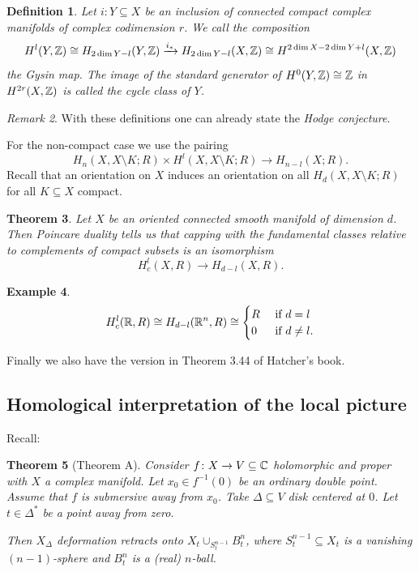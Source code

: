 \documentclass[A4paper, british, reqno]{amsart}
\theoremstyle{darkgreentheorem}
\newtheorem{thm}{Theorem}[section]
\theoremstyle{darkbluedefinition}
\newtheorem{defn}[thm]{Definition}
\theoremstyle{darkredexample}
\newtheorem{exa}[thm]{Example}
\theoremstyle{remark}
\newtheorem{rem}[thm]{Remark}
\newcommand{\1}{\mathbbm{1}}
\newcommand{\tms}{\times}
\newcommand{\sub}{\subseteq}
\begin{document}
\begin{defn}
    Let $i\colon Y\sub X$ be an inclusion of connected compact complex manifolds of complex codimension $r$.
    We call the composition
    \[ H^{l}(Y,\mathbb{Z})\cong H_{2\dim{Y}-l}(Y,\mathbb{Z})\xrightarrow{i_{*}} H_{2\dim{Y}-l}(X,\mathbb{Z})\cong H^{2\dim{X}-2\dim{Y}+l}(X,\mathbb{Z}) \]
    the \textit{Gysin map}.
    The image of the standard generator of $H^{0}(Y,\mathbb{Z})\cong \mathbb{Z}$ in $H^{2r}(X,\mathbb{Z})$ is called the \textit{cycle class} of $Y$.
\end{defn}

\begin{rem}
    With these definitions one can already state the \textit{Hodge conjecture}.
\end{rem}

For the non-compact case we use the pairing
\[ H_{n}(X,X\setminus K;R)\tms H^{l}(X,X\setminus K;R)\to H_{n-l}(X;R). \]
Recall that an orientation on $X$ induces an orientation on all $H_{d}(X,X\setminus K;R)$ for all $K\sub X$ compact.

\begin{thm}
    Let $X$ be an oriented connected smooth manifold of dimension $d$.
    Then Poincare duality tells us that capping with the fundamental classes relative to complements of compact subsets is an isomorphism
    \[ H^{l}_{c}(X,R)\to H_{d-l}(X,R). \]
\end{thm}

\begin{exa}
    \[ H^{l}_{c}(\mathbb{R},R)\cong H_{d-l}(\mathbb{R}^{n},R)\cong \begin{cases}
	R & \text{ if } d=l \\
	0 & \text{ if } d\neq l.
    \end{cases}
    \]
\end{exa}

Finally we also have the version in Theorem 3.44 of Hatcher's book.

\subsection{Homological interpretation of the local picture}

Recall:

\begin{thm}[Theorem A]
    Consider $f\colon X\to V\sub \C$ holomorphic and proper with $X$ a complex manifold.
    Let $x_{0}\in f^{-1}(0)$ be an ordinary double point.
    Assume that $f$ is submersive away from $x_{0}$.
    Take $\Delta\sub V$ disk centered at $0$.
    Let $t\in \Delta^{*}$ be a point away from zero.

    Then $X_{\Delta}$ deformation retracts onto $X_{t}\cup_{S_{t}^{n-1}}B^{n}_{t}$, where $S_{t}^{n-1}\sub X_{t}$ is a vanishing $(n-1)$-sphere and $B_{t}^{n}$ is a (real) $n$-ball.
\end{thm}
\end{document}
